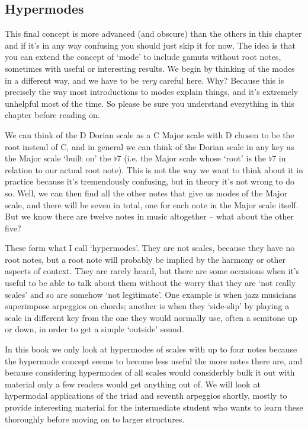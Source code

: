 \documentclass[english]{./gbook}
\begin{document}
\begin{large}
\section*{Hypermodes}

This final concept is more advanced (and obscure) than the others in this chapter and if it's in any way confusing you should just skip it for now. The idea is that you can extend the concept of `mode' to include gamuts without root notes, sometimes with useful or interesting results. We begin by thinking of the modes in a different way, and we have to be \emph{very} careful here. Why? Because this is precisely the way most introductions to modes explain things, and it's extremely unhelpful most of the time. So please be sure you understand everything in this chapter before reading on.

We can think of the D Dorian scale as a C Major scale with D chosen to be the root instead of C, and in general we can think of the Dorian scale in any key as the Major scale `built on' the $\flat$7 (i.e. the Major scale whose `root' is the $\flat$7 in relation to our actual root note). This is not the way we want to think about it in practice because it's tremendously confusing, but in theory it's not wrong to do so. Well, we can then find all the other notes that give us modes of the Major scale, and there will be seven in total, one for each note in the Major scale itself. But we know there are twelve notes in music altogether -- what about the other five?

These form what I call `hypermodes'. They are not scales, because they have no root notes, but a root note will probably be implied by the harmony or other aspects of context. They are rarely heard, but there are some occasions when it's useful to be able to talk about them without the worry that they are `not really scales' and so are somehow `not legitimate'. One example is when jazz musicians superimpose arpeggios on chords; another is when they `side-slip' by playing a scale in different key from the one they would normally use, often a semitone up or down, in order to get a simple `outside' sound.

In this book we only look at hypermodes of scales with up to four notes because the hypermode concept seems to become less useful the more notes there are, and because considering hypermodes of all scales would considerbly bulk it out with material only a few readers would get anything out of. We will look at hypermodal applications of the triad and seventh arpeggios shortly, mostly to provide interesting material for the intermediate student who wants to learn these thoroughly before moving on to larger structures.





\end{large}
\end{document}
